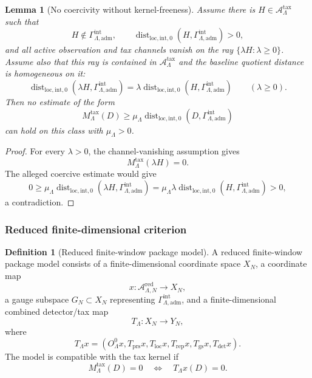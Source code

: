 \documentclass[11pt]{article}
\numberwithin{equation}{section}
\newtheorem{lemma}[lemma]{Lemma}
\theoremstyle{definition}
\newtheorem{definition}[definition]{Definition}
\theoremstyle{remark}
\newcommand{\loc}{\mathrm{loc}}
\newcommand{\adm}{\mathrm{adm}}
\newcommand{\detc}{\mathrm{det}}
\newcommand{\Dist}{\operatorname{dist}}
\begin{document}
\begin{lemma}[No coercivity without kernel-freeness]
\label{lem:no-coercivity-without-kernel}
Assume there is \(H\in\mathcal A_{\Lambda}^{\mathrm{tax}}\) such that
\[
    H\notin\Gamma_{\Lambda,\adm}^{\mathrm{int}},
    \qquad
    \Dist_{\loc,\mathrm{int},0}
    (H,\Gamma_{\Lambda,\adm}^{\mathrm{int}})>0,
\]
and all active observation and tax channels vanish on the ray
\(\{\lambda H:\lambda\ge0\}\).  Assume also that this ray is contained in
\(\mathcal A_{\Lambda}^{\mathrm{tax}}\) and the baseline quotient distance is
homogeneous on it:
\[
    \Dist_{\loc,\mathrm{int},0}
    (\lambda H,\Gamma_{\Lambda,\adm}^{\mathrm{int}})
    =
    \lambda
    \Dist_{\loc,\mathrm{int},0}
    (H,\Gamma_{\Lambda,\adm}^{\mathrm{int}})
    \qquad(\lambda\ge0).
\]
Then no estimate of the form
\[
    M_{\Lambda}^{\mathrm{tax}}(D)
    \ge
    \mu_{\Lambda}
    \Dist_{\loc,\mathrm{int},0}
    (D,\Gamma_{\Lambda,\adm}^{\mathrm{int}})
\]
can hold on this class with \(\mu_{\Lambda}>0\).
\end{lemma}

\begin{proof}
For every \(\lambda>0\), the channel-vanishing assumption gives
\[
    M_{\Lambda}^{\mathrm{tax}}(\lambda H)=0.
\]
The alleged coercive estimate would give
\[
    0
    \ge
    \mu_{\Lambda}
    \Dist_{\loc,\mathrm{int},0}
    (\lambda H,\Gamma_{\Lambda,\adm}^{\mathrm{int}})
    =
    \mu_{\Lambda}\lambda
    \Dist_{\loc,\mathrm{int},0}
    (H,\Gamma_{\Lambda,\adm}^{\mathrm{int}})
    >
    0,
\]
a contradiction.
\end{proof}

\subsubsection{Reduced finite-dimensional criterion}

\begin{definition}[Reduced finite-window package model]
\label{def:reduced-package-model}
A reduced finite-window package model consists of a finite-dimensional coordinate
space \(X_N\), a coordinate map
\[
    x:\mathcal A_{\Lambda,N}^{\mathrm{red}}\to X_N,
\]
a gauge subspace \(G_N\subset X_N\) representing
\(\Gamma_{\Lambda,\adm}^{\mathrm{int}}\), and a finite-dimensional combined
detector/tax map
\[
    T_{\Lambda}:X_N\to Y_N,
\]
where
\[
    T_{\Lambda}x
    =
    \left(
        O^0_{\Lambda}x,
        T_{\mathrm{prs}}x,
        T_{\mathrm{loc}}x,
        T_{\mathrm{rep}}x,
        T_{\mathrm{gs}}x,
        T_{\detc}x
    \right).
\]
The model is compatible with the tax kernel if
\[
    M_{\Lambda}^{\mathrm{tax}}(D)=0
    \quad\Longleftrightarrow\quad
    T_{\Lambda}x(D)=0.
\]
\end{definition}
\end{document}
